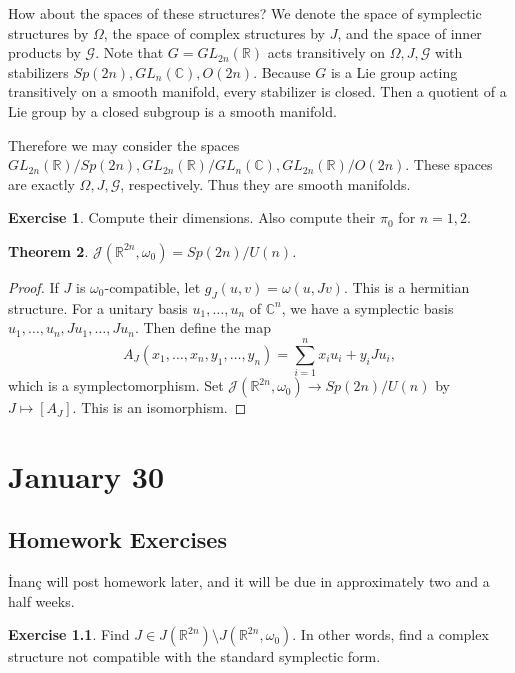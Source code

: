 \documentclass[leqno, openany]{memoir}
\newtheorem{thm}{Theorem}[chapter]
\theoremstyle{definition}
\newtheorem{exer}[thm]{Exercise}
\theoremstyle{remark}
\theoremstyle{plain}
\theoremstyle{definition}
\theoremstyle{remark}
\newcommand{\R}{\mathbb{R}}
\newcommand{\C}{\mathbb{C}}
\newcommand{\mc}[1]{\mathcal{#1}}
\begin{document}
How about the spaces of these structures? We denote the space of symplectic
structures by $\Omega$, the space of complex structures by $J$, and the space
of inner products by $\mc{G}$. Note that $G = GL_{2n}(\R)$ acts transitively on
$\Omega, J, \mc{G}$ with stabilizers $Sp(2n), GL_{n}(\C), O(2n)$. Because $G$
is a Lie group acting transitively on a smooth manifold, every stabilizer is
closed. Then a quotient of a Lie group by a closed subgroup is a smooth
manifold.

Therefore we may consider the spaces $GL_{2n}(\R)/Sp(2n), GL_{2n}(\R)/GL_n(\C),
GL_{2n}(\R)/O(2n)$. These spaces are exactly $\Omega, J, \mc{G}$, respectively.
Thus they are smooth manifolds.

\begin{exer} Compute their dimensions. Also compute their $\pi_0$ for $n =
1,2$.  \end{exer}

\begin{thm} $\mc{J}(\R^{2n}, \omega_0) = Sp(2n)/U(n)$.  \end{thm}

\begin{proof} If $J$ is $\omega_0$-compatible, let $g_J(u,v) = \omega(u, Jv)$.
    This is a hermitian structure. For a unitary basis $u_1, \ldots, u_n$ of
    $\C^n$, we have a symplectic basis $u_1, \ldots, u_n, Ju_1, \ldots, Ju_n$.
    Then define the map \[A_J(x_1, \ldots, x_n, y_1, \ldots, y_n) =
    \sum_{i=1}^n x_iu_i + y_iJu_i, \] which is a symplectomorphism. Set
$\mc{J}(\R^{2n}, \omega_0) \to Sp(2n)/U(n)$ by $J \mapsto [A_J]$. This is an
isomorphism.  \end{proof}

\chapter{January 30}%

\section{Homework Exercises}%

\.Inan\c{c} will post homework later, and it will be due in approximately two
and a half weeks.

\begin{exer} Find $J \in J(\R^{2n}) \setminus J(\R^{2n}, \omega_0)$. In other
words, find a complex structure not compatible with the standard symplectic
form.  \end{exer}
\end{document}
